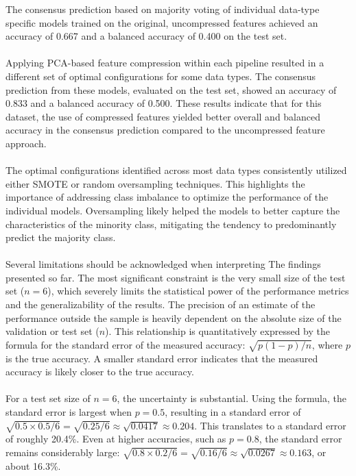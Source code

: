 \documentclass[12pt,a4paper]{report}
\begin{document}
\noindent
The consensus prediction based on majority voting of individual data-type specific models trained on the original, uncompressed features achieved an accuracy of 0.667 and a balanced accuracy of 0.400 on the test set.\\
\\
Applying PCA-based feature compression within each pipeline resulted in a different set of optimal configurations for some data types. The consensus prediction from these models, evaluated on the test set, showed an accuracy of 0.833 and a balanced accuracy of 0.500. These results indicate that for this dataset, the use of compressed features yielded better overall and balanced accuracy in the consensus prediction compared to the uncompressed feature approach.\\
\\
The optimal configurations identified across most data types consistently utilized either SMOTE or random oversampling techniques. This highlights the importance of addressing class imbalance to optimize the performance of the individual models. Oversampling likely helped the models to better capture the characteristics of the minority class, mitigating the tendency to predominantly predict the majority class.\\
\\
Several limitations should be acknowledged when interpreting The findings presented so far. The most significant constraint is the very small size of the test set ($n=6$), which severely limits the statistical power of the performance metrics and the generalizability of the results. The precision of an estimate of the performance outside the sample is heavily dependent on the absolute size of the validation or test set ($n$). This relationship is quantitatively expressed by the formula for the standard error of the measured accuracy: $\sqrt{p(1-p)/n}$, where $p$ is the true accuracy. A smaller standard error indicates that the measured accuracy is likely closer to the true accuracy.\\
\\
For a test set size of $n=6$, the uncertainty is substantial. Using the formula, the standard error is largest when $p=0.5$, resulting in a standard error of $\sqrt{0.5 \times 0.5 / 6} = \sqrt{0.25 / 6} \approx \sqrt{0.0417} \approx 0.204$. This translates to a standard error of roughly 20.4\%. Even at higher accuracies, such as $p=0.8$, the standard error remains considerably large: $\sqrt{0.8 \times 0.2 / 6} = \sqrt{0.16 / 6} \approx \sqrt{0.0267} \approx 0.163$, or about 16.3\%.\\
\end{document}
